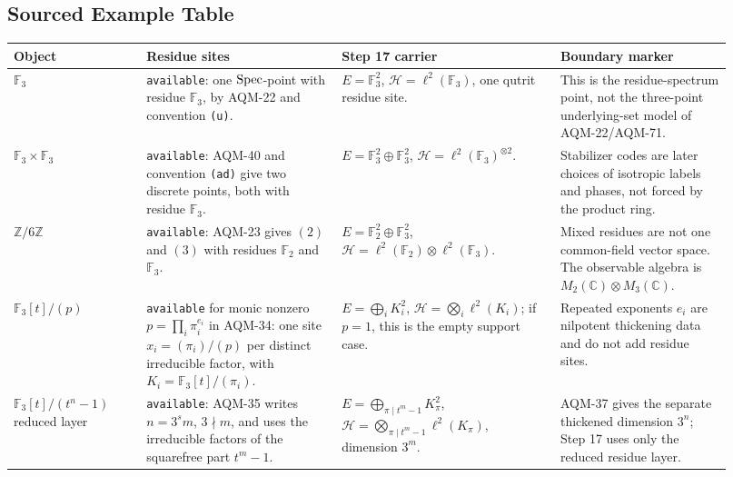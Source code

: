 \subsection{Sourced Example Table}

\begin{center}
\scriptsize\setlength{\tabcolsep}{3pt}
\begin{tabular}{p{0.17\linewidth}p{0.25\linewidth}p{0.28\linewidth}p{0.22\linewidth}}
\toprule
Object & Residue sites & Step 17 carrier & Boundary marker \\
\midrule
\(\mathbb F_3\) &
\texttt{available}: one \(\operatorname{Spec}\)-point with residue \(\mathbb F_3\), by
AQM-22 and convention \texttt{(u)}. &
\(E=\mathbb F_3^2\),
\(\mathcal H=\ell^2(\mathbb F_3)\), one qutrit residue site. &
This is the residue-spectrum point, not the three-point underlying-set model
of AQM-22/AQM-71. \\
\addlinespace
\(\mathbb F_3\times\mathbb F_3\) &
\texttt{available}: AQM-40 and convention \texttt{(ad)} give two discrete
points, both with residue \(\mathbb F_3\). &
\(E=\mathbb F_3^2\oplus\mathbb F_3^2\),
\(\mathcal H=\ell^2(\mathbb F_3)^{\otimes2}\). &
Stabilizer codes are later choices of isotropic labels and phases, not forced
by the product ring. \\
\addlinespace
\(\mathbb Z/6\mathbb Z\) &
\texttt{available}: AQM-23 gives \((2)\) and \((3)\) with residues
\(\mathbb F_2\) and \(\mathbb F_3\). &
\(E=\mathbb F_2^2\oplus\mathbb F_3^2\),
\(\mathcal H=\ell^2(\mathbb F_2)\otimes\ell^2(\mathbb F_3)\). &
Mixed residues are not one common-field vector space.  The observable algebra
is \(M_2(\mathbb C)\otimes M_3(\mathbb C)\). \\
\addlinespace
\(\mathbb F_3[t]/(p)\) &
\texttt{available} for monic nonzero \(p=\prod_i\pi_i^{e_i}\) in AQM-34:
one site \(x_i=(\pi_i)/(p)\) per distinct irreducible factor, with
\(K_i=\mathbb F_3[t]/(\pi_i)\). &
\(E=\bigoplus_iK_i^2\),
\(\mathcal H=\bigotimes_i\ell^2(K_i)\); if \(p=1\), this is the empty support
case. &
Repeated exponents \(e_i\) are nilpotent thickening data and do not add
residue sites. \\
\addlinespace
\(\mathbb F_3[t]/(t^n-1)\) reduced layer &
\texttt{available}: AQM-35 writes \(n=3^s m\), \(3\nmid m\), and uses the
irreducible factors of the squarefree part \(t^m-1\). &
\(E=\bigoplus_{\pi\mid t^m-1}K_\pi^2\),
\(\mathcal H=\bigotimes_{\pi\mid t^m-1}\ell^2(K_\pi)\), dimension \(3^m\). &
AQM-37 gives the separate thickened dimension \(3^n\); Step 17 uses only the
reduced residue layer. \\

\end{tabular}
\end{center}
